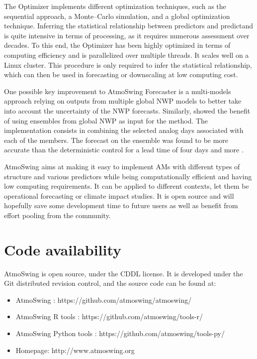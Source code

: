 \documentclass[review]{elsarticle}
\begin{document}
The Optimizer implements different optimization techniques, such as the sequential approach, a Monte--Carlo simulation, and a global optimization technique. Inferring the statistical relationship between predictors and predictand is quite intensive in terms of processing, as it requires numerous assessment over decades. To this end, the Optimizer has been highly optimized in terms of computing efficiency and is parallelized over multiple threads. It scales well on a Linux cluster. This procedure is only required to infer the statistical relationship, which can then be used in forecasting or downscaling at low computing cost. 

One possible key improvement to AtmoSwing Forecaster is a multi-models approach relying on outputs from multiple global NWP models to better take into account the uncertainty of the NWP forecasts. Similarly, \citet{Thevenot2004} showed the benefit of using ensembles from global NWP as input for the method. The implementation consists in combining the selected analog days associated with each of the members. The forecast on the ensemble was found to be more accurate than the deterministic control for a lead time of four days and more \citep{Thevenot2004}. 

AtmoSwing aims at making it easy to implement AMs with different types of structure and various predictors while being computationally efficient and having low computing requirements. It can be applied to different contexts, let them be operational forecasting or climate impact studies. It is open source and will hopefully save some development time to future users as well as benefit from effort pooling from the community.


\section*{Code availability}

AtmoSwing is open source, under the CDDL license. It is developed under the Git distributed revision control, and the source code can be found at:

\begin{itemize}
	\item AtmoSwing \citep{Horton2018c}: https://github.com/atmoswing/atmoswing/
	\item AtmoSwing R tools \citep{Horton2018d}: https://github.com/atmoswing/tools-r/
	\item AtmoSwing Python tools \citep{Horton2018e}: https://github.com/atmoswing/tools-py/
	\item Homepage: http://www.atmoswing.org
\end{itemize}
\end{document}
